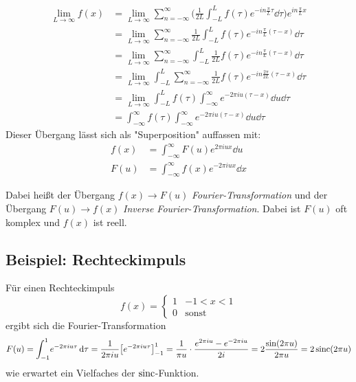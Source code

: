 		\begin{align*}
			\lim\limits_{L \to \infty} f(x)
				&= \lim\limits_{L \to \infty} \sum_{n = -\infty}^{\infty} \Bigg( \frac{1}{2L} \int_{-L}^{L} \! f(\tau) e^{-in \frac{\pi}{L} \tau} \dd{\tau} \Bigg) e^{in \frac{\pi}{L} x} \\
				&= \lim\limits_{L \to \infty} \sum_{n = -\infty}^{\infty} \frac{1}{2L} \int_{-L}^{L} \! f(\tau) e^{-in \frac{\pi}{L} (\tau - x)} \dd{\tau} \\
				&= \lim\limits_{L \to \infty} \sum_{n = -\infty}^{\infty} \int_{-L}^{L} \! \frac{1}{2L} f(\tau) e^{-in \frac{\pi}{L} (\tau - x)} \dd{\tau} \\
				&= \lim\limits_{L \to \infty} \int_{-L}^{L} \sum_{n = -\infty}^{\infty} \frac{1}{2L} f(\tau) e^{-in \frac{2\pi}{2L} (\tau - x)} \dd{\tau} \\
				&= \lim\limits_{L \to \infty} \int_{-L}^{L} \! f(\tau) \int_{-\infty}^{\infty} \! e^{-2\pi i u (\tau - x)} \dd{u} \dd{\tau} \\
				&= \int_{-\infty}^{\infty} \! f(\tau) \int_{-\infty}^{\infty} \! e^{-2\pi i u (\tau - x)} \dd{u} \dd{\tau}
		\end{align*}
		Dieser Übergang lässt sich als "Superposition" auffassen mit:
		\begin{align*}
			f(x) &= \int_{-\infty}^{\infty} \! F(u) e^{ 2\pi i u x} \dd{u} \\
			F(u) &= \int_{-\infty}^{\infty} \! f(x) e^{-2\pi i u x} \dd{x}
		\end{align*}
		
		Dabei heißt der Übergang \( f(x) \to F(u) \) \emph{Fourier-Transformation} und der Übergang \( F(u) \to f(x) \) \emph{Inverse Fourier-Transformation}. Dabei ist \(F(u)\) oft komplex und \(f(x)\) ist reell.

		\subsection{Beispiel: Rechteckimpuls}
			Für einen Rechteckimpuls
			\begin{equation*}
				f(x) =
					\begin{cases}
						1 & -1 < x < 1 \\
						0 & \text{sonst}
					\end{cases}
			\end{equation*}
			ergibt sich die Fourier-Transformation
			\begin{equation*}
				F(u) = \int_{-1}^{1} \! e^{-2\pi i u \tau} \dd{\tau} = \frac{1}{2\pi i u} \big[ e^{-2\pi i u \tau} \big]_{-1}^{1} = \frac{1}{\pi u} \cdot \frac{e^{2\pi i u} - e^{-2\pi i u}}{2i} = 2 \frac{\sin(2\pi u)}{2\pi u} = 2 \operatorname{sinc}(2\pi u)
			\end{equation*}
			wie erwartet ein Vielfaches der \( \operatorname{sinc} \)-Funktion.

